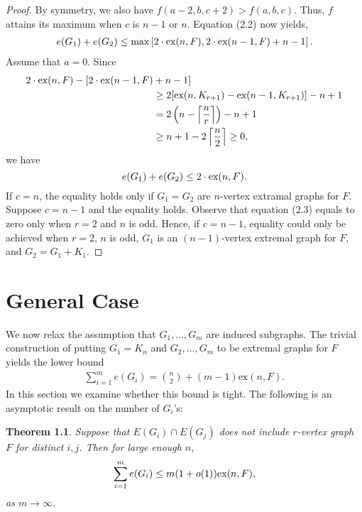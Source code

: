 \documentclass[12pt]{report}
\newtheorem{theorem}{Theorem}[chapter]
\begin{document}
\begin{proof}
  By symmetry, we also have $f(a - 2, b, c + 2) > f(a, b, c)$. Thus, $f$ attains its maximum when
  $c$ is $n - 1$ or $n$. Equation (2.2) now yields, 
  \begin{align*}
    e(G_1) + e(G_2) \leq \max\left[2 \cdot \textnormal{ex}(n, F), 2 \cdot \textnormal{ex}(n - 1, F) + n - 1\right].
  \end{align*}
  Assume that $a = 0$. Since
  \begin{align}
    2 \cdot \textnormal{ex}(n, F) - 
    [2 \cdot \textnormal{ex}(n - 1, F) &+ n - 1] \nonumber \\
    &\geq 2[\textnormal{ex}(n, K_{r + 1}) - \textnormal{ex}(n - 1, K_{r + 1})] - n + 1 \\
    &= 2\left(n - \left\lceil \frac{n}{r} \right\rceil\right) - n + 1 \nonumber  \\
    &\geq n + 1 - 2\left\lceil \frac{n}{2} \right\rceil \geq 0,  \nonumber 
  \end{align}
  we have
  \[
    e(G_1) + e(G_2) \leq 2 \cdot \textnormal{ex}(n, F).
  \]
  If $c = n$, the equality holds only if $G_1 = G_2$ are $n$-vertex extramal graphs for $F$. Suppose
  $c = n - 1$ and the equality holds. Observe that equation (2.3) equals to zero only when $r = 2$
  and $n$ is odd. Hence, if $c = n - 1$, equality could only be achieved when $r = 2$, $n$ is odd,
  $G_1$ is an $(n - 1)$-vertex extremal graph for $F$, and $G_2 = G_1 + K_1$.
\end{proof}

\chapter{General Case}

We now relax the assumption that $G_1, \dots, G_m$ are induced subgraphs. The trivial construction
of putting $G_1 = K_n$ and $G_2, \ldots, G_m$ to be extremal graphs for $F$ yields the lower bound
\begin{gather}
	\sum_{i = 1}^m e(G_i) = \binom{n}{2} + (m - 1)\text{ex}(n, F).
\end{gather}
In this section we examine whether this bound is tight. The following is an asymptotic result on the
number of $G_i$'s:

\begin{theorem}
	Suppose that $E(G_i) \cap E(G_j)$ does not include $r$-vertex graph $F$ for distinct $i, j$. Then
	for large enough $n$,
	\[
		\sum_{i = 1}^m e(G_i) \leq m(1 + o(1))\textnormal{ex}(n, F),
	\]
	as $m \to \infty$.
\end{theorem}
\end{document}

